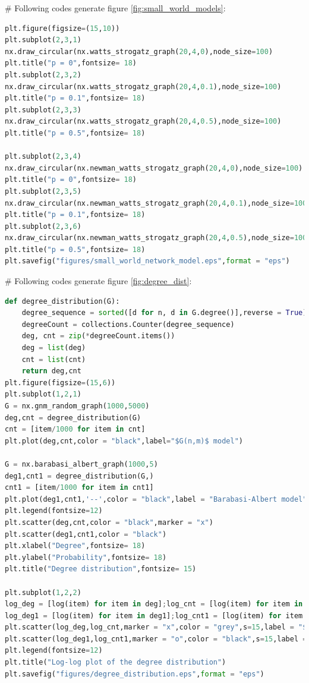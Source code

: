 \documentclass[12pt]{article}
\begin{document}
\noindent
\newline
\# Following codes generate figure \ref{fig:small_world_models}:
\begin{lstlisting}[breaklines=true,language=Python]
plt.figure(figsize=(15,10))
plt.subplot(2,3,1)
nx.draw_circular(nx.watts_strogatz_graph(20,4,0),node_size=100)
plt.title("p = 0",fontsize= 18)
plt.subplot(2,3,2)
nx.draw_circular(nx.watts_strogatz_graph(20,4,0.1),node_size=100)
plt.title("p = 0.1",fontsize= 18)
plt.subplot(2,3,3)
nx.draw_circular(nx.watts_strogatz_graph(20,4,0.5),node_size=100)
plt.title("p = 0.5",fontsize= 18)

plt.subplot(2,3,4)
nx.draw_circular(nx.newman_watts_strogatz_graph(20,4,0),node_size=100)
plt.title("p = 0",fontsize= 18)
plt.subplot(2,3,5)
nx.draw_circular(nx.newman_watts_strogatz_graph(20,4,0.1),node_size=100)
plt.title("p = 0.1",fontsize= 18)
plt.subplot(2,3,6)
nx.draw_circular(nx.newman_watts_strogatz_graph(20,4,0.5),node_size=100)
plt.title("p = 0.5",fontsize= 18)
plt.savefig("figures/small_world_network_model.eps",format = "eps")
\end{lstlisting}
\noindent
\newline
\# Following codes generate figure \ref{fig:degree_dist}:
\begin{lstlisting}[breaklines=true,language=Python]
    def degree_distribution(G):
    degree_sequence = sorted([d for n, d in G.degree()],reverse = True)
    degreeCount = collections.Counter(degree_sequence)
    deg, cnt = zip(*degreeCount.items())
    deg = list(deg)
    cnt = list(cnt)
    return deg,cnt
plt.figure(figsize=(15,6))
plt.subplot(1,2,1)
G = nx.gnm_random_graph(1000,5000)
deg,cnt = degree_distribution(G)
cnt = [item/1000 for item in cnt]
plt.plot(deg,cnt,color = "black",label="$G(n,m)$ model")

G = nx.barabasi_albert_graph(1000,5)
deg1,cnt1 = degree_distribution(G,)
cnt1 = [item/1000 for item in cnt1]
plt.plot(deg1,cnt1,'--',color = "black",label = "Barabasi-Albert model")
plt.legend(fontsize=12)
plt.scatter(deg,cnt,color = "black",marker = "x")
plt.scatter(deg1,cnt1,color = "black")
plt.xlabel("Degree",fontsize= 18)
plt.ylabel("Probability",fontsize= 18)
plt.title("Degree distribution",fontsize= 15)

plt.subplot(1,2,2)
log_deg = [log(item) for item in deg];log_cnt = [log(item) for item in cnt]
log_deg1 = [log(item) for item in deg1];log_cnt1 = [log(item) for item in cnt1]
plt.scatter(log_deg,log_cnt,marker = "x",color = "grey",s=15,label = "$G(n,m) model$")
plt.scatter(log_deg1,log_cnt1,marker = "o",color = "black",s=15,label = "Barabasi-Albert model")
plt.legend(fontsize=12)
plt.title("Log-log plot of the degree distribution")
plt.savefig("figures/degree_distribution.eps",format = "eps")
\end{lstlisting}
\end{document}

